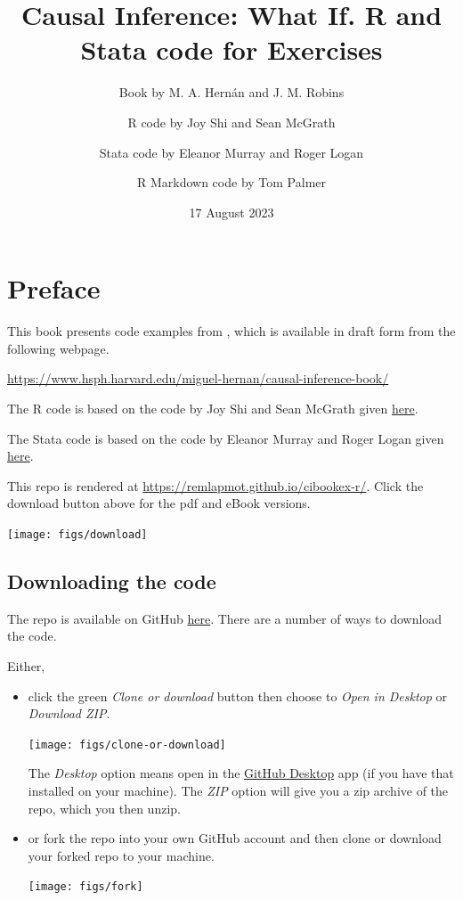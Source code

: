 \documentclass[
  10pt,
  a4paper,
]{book}
\title{Causal Inference: What If. R and Stata code for Exercises}
\author{Book by M. A. Hernán and J. M. Robins \and R code by Joy Shi and Sean McGrath \and Stata code by Eleanor Murray and Roger Logan \and R Markdown code by Tom Palmer}
\date{17 August 2023}
\begin{document}
\maketitle

\thispagestyle{empty}

{
\hypersetup{linkcolor=}
\setcounter{tocdepth}{1}
\tableofcontents
}
\hypertarget{preface}{%
\chapter*{Preface}\label{preface}}

This book presents code examples from \citet{ci-book}, which is available in draft form from the following webpage.

\url{https://www.hsph.harvard.edu/miguel-hernan/causal-inference-book/}

The R code is based on the code by Joy Shi and Sean McGrath given \href{https://cdn1.sph.harvard.edu/wp-content/uploads/sites/1268/1268/20/Rcode_CIpart2.zip}{here}.

The Stata code is based on the code by Eleanor Murray and Roger Logan given \href{https://cdn1.sph.harvard.edu/wp-content/uploads/sites/1268/2019/11/stata_part2.zip}{here}.

This repo is rendered at \url{https://remlapmot.github.io/cibookex-r/}. Click the download button above for the pdf and eBook versions.

\begin{center}\texttt{[image: figs/download]} \end{center}

\hypertarget{downloading-the-code}{%
\section{Downloading the code}\label{downloading-the-code}}

The repo is available on GitHub \href{https://github.com/remlapmot/cibookex-r}{here}. There are a number of ways to download the code.

Either,

\begin{itemize}
\item
  click the green \emph{Clone or download} button then choose to \emph{Open in Desktop} or \emph{Download ZIP}.

  \begin{center}\texttt{[image: figs/clone-or-download]} \end{center}

  The \emph{Desktop} option means open in the \href{https://desktop.github.com/}{GitHub Desktop} app (if you have that installed on your machine). The \emph{ZIP} option will give you a zip archive of the repo, which you then unzip.
\item
  or fork the repo into your own GitHub account and then clone or download your forked repo to your machine.

  \begin{center}\texttt{[image: figs/fork]} \end{center}
\end{itemize}
\end{document}
